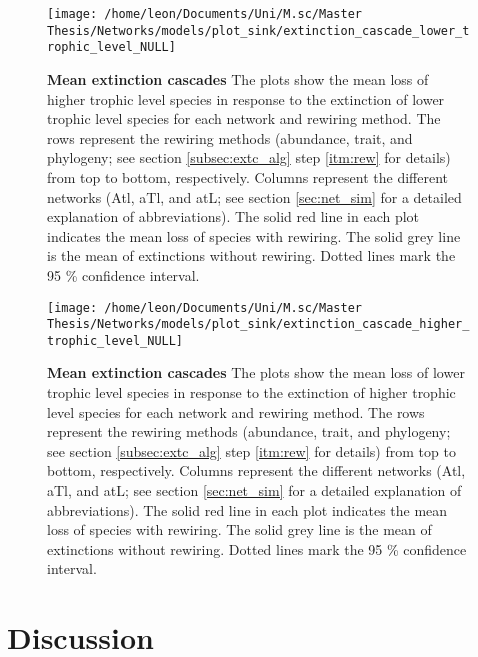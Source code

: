\documentclass[12pt,a4paper]{article}
\begin{document}
\begin{figure}[H]
	 \texttt{[image: /home/leon/Documents/Uni/M.sc/Master Thesis/Networks/models/plot\_sink/extinction\_cascade\_lower\_trophic\_level\_NULL]}
	 \caption{\textbf{Mean extinction cascades} The plots show the mean loss of higher trophic level species in response to the extinction of lower trophic level species for each network and rewiring method. The rows represent the rewiring methods (abundance, trait, and phylogeny; see section \ref{subsec:extc_alg} step \ref{itm:rew} for details) from top to bottom, respectively. Columns represent the different networks (Atl, aTl, and atL; see section \ref{sec:net_sim} for a detailed explanation of abbreviations). The solid red line in each plot indicates the mean loss of species with rewiring. The solid grey line is the mean of extinctions without rewiring. Dotted lines mark the 95 \% confidence interval.}
	 \label{fig:extc_sims_lower}
\end{figure}

\begin{figure}[H]
	 \texttt{[image: /home/leon/Documents/Uni/M.sc/Master Thesis/Networks/models/plot\_sink/extinction\_cascade\_higher\_trophic\_level\_NULL]}
	 \caption{\textbf{Mean extinction cascades} The plots show the mean loss of lower trophic level species in response to the extinction of higher trophic level species for each network and rewiring method. The rows represent the rewiring methods (abundance, trait, and phylogeny; see section \ref{subsec:extc_alg} step \ref{itm:rew} for details) from top to bottom, respectively. Columns represent the different networks (Atl, aTl, and atL; see section \ref{sec:net_sim} for a detailed explanation of abbreviations). The solid red line in each plot indicates the mean loss of species with rewiring. The solid grey line is the mean of extinctions without rewiring. Dotted lines mark the 95 \% confidence interval.}
	 \label{fig:extc_sims_higher}
\end{figure}


\newpage
	\section{Discussion}

\end{document}
